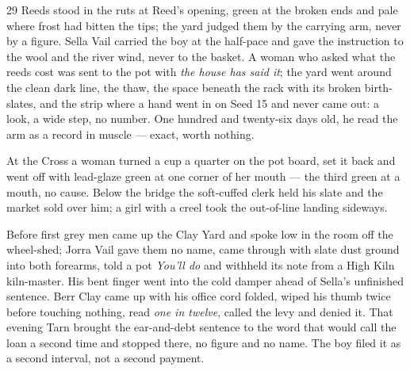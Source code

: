 
\scenebreak

\scenebreak


\scenebreak


\scenebreak

\CRtailpiece
\begin{CRchronicle}{29}
Reeds stood in the ruts at Reed’s opening, green at the broken ends and pale where frost had bitten the tips; the yard judged them by the carrying arm, never by a figure. Sella Vail carried the boy at the half-pace and gave the instruction to the wool and the river wind, never to the basket. A woman who asked what the reeds cost was sent to the pot with \emph{the house has said it}; the yard went around the clean dark line, the thaw, the space beneath the rack with its broken birth-slates, and the strip where a hand went in on Seed 15 and never came out: a look, a wide step, no number. One hundred and twenty-six days old, he read the arm as a record in muscle --- exact, worth nothing.

At the Cross a woman turned a cup a quarter on the pot board, set it back and went off with lead-glaze green at one corner of her mouth --- the third green at a mouth, no cause. Below the bridge the soft-cuffed clerk held his slate and the market sold over him; a girl with a creel took the out-of-line landing sideways.

Before first grey men came up the Clay Yard and spoke low in the room off the wheel-shed; Jorra Vail gave them no name, came through with slate dust ground into both forearms, told a pot \emph{You’ll do} and withheld its note from a High Kiln kiln-master. His bent finger went into the cold damper ahead of Sella’s unfinished sentence. Berr Clay came up with his office cord folded, wiped his thumb twice before touching nothing, read \emph{one in twelve}, called the levy and denied it. That evening Tarn brought the ear-and-debt sentence to the word that would call the loan a second time and stopped there, no figure and no name. The boy filed it as a second interval, not a second payment.


\end{CRchronicle}
